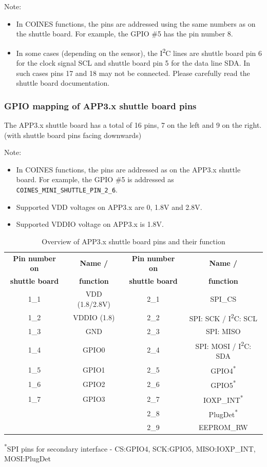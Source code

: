 \documentclass[11pt,headings=small]{scrartcl}
\begin{document}
Note:
\begin{itemize}
	\item In COINES functions, the pins are addressed using the same numbers as on the shuttle board. For example, the GPIO \#5 has the pin number 8.
	\item In some cases (depending on the sensor), the I\textsuperscript{2}C lines are shuttle board pin 6 for the clock signal SCL and shuttle board pin 5 for the data line SDA. In such cases pins 17 and 18 may not be connected. Please carefully read the shuttle board documentation.
\end{itemize}

\subsubsection{GPIO mapping of APP3.x shuttle board pins}

The APP3.x shuttle board has a total of 16 pins, 7 on the left and 9 on the right. (with shuttle board pins facing downwards)

Note:
\begin{itemize}
	\item In COINES functions, the pins are addressed as on the APP3.x shuttle board. For example, the GPIO \#5 is addressed as \texttt{COINES\_MINI\_SHUTTLE\_PIN\_2\_6}.
	\item Supported VDD voltages on APP3.x are 0, 1.8V and 2.8V.
	\item Supported VDDIO voltage on APP3.x is 1.8V.
\end{itemize}

\begin{table}[H]
	\centering
	\begin{tabular}{|c|c|c|c|}
		\hline
		\textbf{Pin number on} & \textbf{Name /} & \textbf{Pin number on} & \textbf{Name /} \\
		\textbf{shuttle board} & \textbf{function} & \textbf{shuttle board} & \textbf{function} \\
		\hline\hline
		1\_1 & VDD (1.8/2.8V) & 2\_1 & SPI\_CS \\ \hline
		1\_2 & VDDIO (1.8) & 2\_2 & SPI: SCK / I\textsuperscript{2}C: SCL \\ \hline
		1\_3 & GND & 2\_3 & SPI: MISO \\ \hline
		1\_4 & GPIO0 & 2\_4 & SPI: MOSI /  I\textsuperscript{2}C: SDA \\ \hline
		1\_5 & GPIO1 & 2\_5 & GPIO4\textsuperscript{*} \\ \hline
		1\_6 & GPIO2 & 2\_6 & GPIO5\textsuperscript{*} \\ \hline
		1\_7 & GPIO3 & 2\_7 & IOXP\_INT\textsuperscript{*}\\ \hline
		     &       & 2\_8 & PlugDet\textsuperscript{*} \\ \hline
		     &       & 2\_9 & EEPROM\_RW \\ \hline
	\end{tabular}
	\caption{Overview of APP3.x shuttle board pins and their function}
	\label{tab:shtbrdpins}
	\textsuperscript{*}SPI pins for secondary interface - CS:GPIO4, SCK:GPIO5, MISO:IOXP\_INT, MOSI:PlugDet
\end{table}
\end{document}
